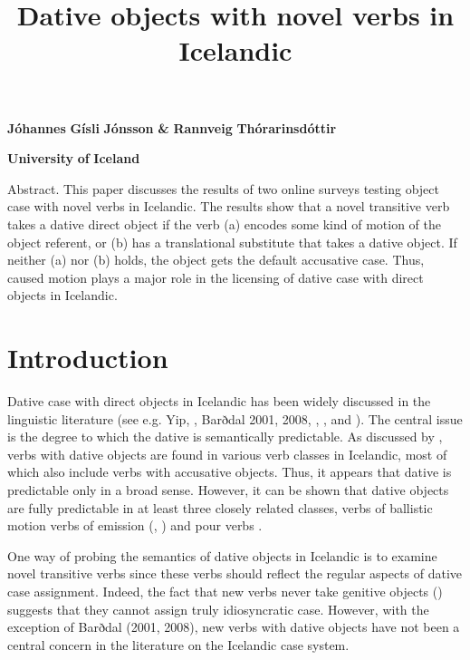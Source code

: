 
\title{Dative objects with novel verbs in Icelandic} 

\textbf{Jóhannes} \textbf{Gísli} \textbf{Jónsson} \textbf{\&} \textbf{Rannveig} \textbf{Thórarinsdóttir}

\textbf{University} \textbf{of} \textbf{Iceland}

\begin{stylelsAbstract}
Abstract. This paper discusses the results of two online surveys testing object case with novel verbs in Icelandic. The results show that a novel transitive verb takes a dative direct object if the verb (a) encodes some kind of motion of the object referent, or (b) has a translational substitute that takes a dative object. If neither (a) nor (b) holds, the object gets the default accusative case. Thus, caused motion plays a major role in the licensing of dative case with direct objects in Icelandic.
\end{stylelsAbstract}

\section{Introduction} %

Dative case with direct objects in Icelandic has been widely discussed in the linguistic literature (see e.g. Yip, \citealt{MalingJackendoff1987}, Barðdal 2001, 2008, \citealt{Svenonius2002}, \citealt{Maling2002}, and \citealt{Jónsson2013a}). The central issue is the degree to which the dative is semantically predictable. As discussed by \citet{Maling2002}, verbs with dative objects are found in various verb classes in Icelandic, most of which also include verbs with accusative objects. Thus, it appears that dative is predictable only in a broad sense. However, it can be shown that dative objects are fully predictable in at least three closely related classes, verbs of ballistic motion \citep{Svenonius2002} verbs of emission (\citealt{Maling2002}, \citealt{Jónsson2013a}) and pour verbs \citep{Jónsson2013a}.

One way of probing the semantics of dative objects in Icelandic is to examine novel transitive verbs since these verbs should reflect the regular aspects of dative case assignment. Indeed, the fact that new verbs never take genitive objects (\citealt{JónssonEythórsson2011}) suggests that they cannot assign truly idiosyncratic case. However, with the exception of Barðdal (2001, 2008), new verbs with dative objects have not been a central concern in the literature on the Icelandic case system. 

